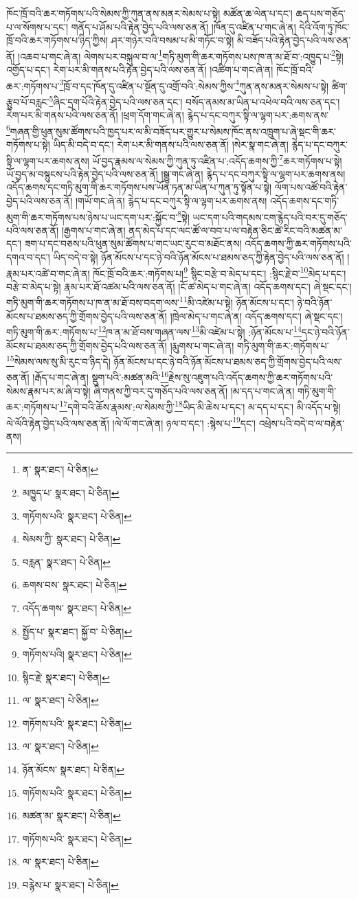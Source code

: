 ཁོང་ཁྲོ་བའི་ཆར་གཏོགས་པའི་སེམས་ཀྱི་ཀུན་ནས་མནར་སེམས་པ་སྟེ། མཚོན་ཆ་ལེན་པ་དང་། ཆད་པས་གཅོད་པ་ལ་སོགས་པ་དང་། གནོད་པ་ཤོམ་པའི་རྟེན་བྱེད་པའི་ལས་ཅན་ནོ། །ཁོན་དུ་འཛིན་པ་གང་ཞེ་ན། དེའི་འོག་ཏུ་ཁོང་ཁྲོ་བའི་ཆར་གཏོགས་པ་ཉིད་ཀྱིས། ཤར་གཉེར་བའི་བསམ་པ་མི་གཏོང་བ་སྟེ། མི་བཟོད་པའི་རྟེན་བྱེད་པའི་ལས་ཅན་ནོ། །འཆབ་པ་གང་ཞེ་ན། ལེགས་པར་བསྐུལ་བ་ལ་\footnote{ན་  སྣར་ཐང་།  པེ་ཅིན། }གཏི་མུག་གི་ཆར་གཏོགས་པས་ཁ་ན་མ་ཐོ་བ་:འཁྱུད་པ་\footnote{མཁྱུད་པ་  སྣར་ཐང་།  པེ་ཅིན། }སྟེ། འགྱོད་པ་དང་། རེག་པར་མི་གནས་པའི་རྟེན་བྱེད་པའི་ལས་ཅན་ནོ། །འཚིག་པ་གང་ཞེ་ན། ཁོང་ཁྲོ་བའི་ཆར་:གཏོགས་པ་\footnote{གཏོགས་པའི་  སྣར་ཐང་།  པེ་ཅིན། }ཁྲོ་བ་དང་ཁོན་དུ་འཛིན་པ་སྔོན་དུ་འགྲོ་བའི་:སེམས་ཀྱིས་\footnote{སེམས་ཀྱི་  སྣར་ཐང་།  པེ་ཅིན། }ཀུན་ནས་མནར་སེམས་པ་སྟེ། ཚིག་རྩུབ་པོ་བརླང་\footnote{བརླན་  སྣར་ཐང་།  པེ་ཅིན། }ཞིང་དྲག་པོའི་རྟེན་བྱེད་པའི་ལས་ཅན་དང་། བསོད་ནམས་མ་ཡིན་པ་འཕེལ་བའི་ལས་ཅན་དང་། རེག་པར་མི་གནས་པའི་ལས་ཅན་ནོ། །ཕྲག་དོག་གང་ཞེ་ན། རྙེད་པ་དང་བཀུར་སྟི་ལ་ལྷག་པར་:ཆགས་ནས་\footnote{ཆགས་བས་  སྣར་ཐང་།  པེ་ཅིན། }གཞན་གྱི་ཕུན་སུམ་ཚོགས་པའི་ཁྱད་པར་ལ་མི་བཟོད་པར་གྱུར་པ་སེམས་ཁོང་ནས་འཁྲུག་པ་ཞེ་སྡང་གི་ཆར་གཏོགས་པ་སྟེ། ཡིད་མི་བདེ་བ་དང་། རེག་པར་མི་གནས་པའི་ལས་ཅན་ནོ། །སེར་སྣ་གང་ཞེ་ན། རྙེད་པ་དང་བཀུར་སྟི་ལ་ལྷག་པར་ཆགས་ནས། ཡོ་བྱད་རྣམས་ལ་སེམས་ཀྱི་ཀུན་ཏུ་འཛིན་པ་:འདོད་ཆགས་ཀྱི་\footnote{འདོད་ཆགས་  སྣར་ཐང་།  པེ་ཅིན། }ཆར་གཏོགས་པ་སྟེ། ཡོ་བྱད་མ་བསྙུངས་པའི་རྟེན་བྱེད་པའི་ལས་ཅན་ནོ། །སྒྱུ་གང་ཞེ་ན། རྙེད་པ་དང་བཀུར་སྟི་ལ་ལྷག་པར་ཆགས་ནས། འདོད་ཆགས་དང་གཏི་མུག་གི་ཆར་གཏོགས་པས་ཡོན་ཏན་མ་ཡིན་པ་ཀུན་ཏུ་སྟོན་པ་སྟེ། ལོག་པས་འཚོ་བའི་རྟེན་བྱེད་པའི་ལས་ཅན་ནོ། །གཡོ་གང་ཞེ་ན། རྙེད་པ་དང་བཀུར་སྟི་ལ་ལྷག་པར་ཆགས་ནས། འདོད་ཆགས་དང་གཏི་མུག་གི་ཆར་གཏོགས་པས་ཉེས་པ་ཡང་དག་པར་:སྐྱོང་བ་\footnote{སྤྱོད་པ་  སྣར་ཐང་། སྐྱོ་བ་  པེ་ཅིན། }སྟེ། ཡང་དག་པའི་གདམས་ངག་རྙེད་པའི་བར་དུ་གཅོད་པའི་ལས་ཅན་ནོ། །རྒྱགས་པ་གང་ཞེ་ན། ནད་མེད་པ་དང་ལང་ཚོ་ལ་བབ་པ་ལ་བརྟེན་ཅིང་ཚེ་རིང་བའི་མཚན་མ་དང་། ཟག་པ་དང་བཅས་པའི་ཕུན་སུམ་ཚོགས་པ་གང་ཡང་རུང་བ་མཐོང་ནས། འདོད་ཆགས་ཀྱི་ཆར་གཏོགས་པའི་དགའ་བ་དང་། ཡིད་བདེ་བ་སྟེ། ཉོན་མོངས་པ་དང་ཉེ་བའི་ཉོན་མོངས་པ་ཐམས་ཅད་ཀྱི་རྟེན་བྱེད་པའི་ལས་ཅན་ནོ། །རྣམ་པར་འཚེ་བ་གང་ཞེ་ན། ཁོང་ཁྲོ་བའི་ཆར་:གཏོགས་པ།\footnote{གཏོགས་པའི།  སྣར་ཐང་།  པེ་ཅིན། } སྙིང་བརྩེ་བ་མེད་པ་དང་། :སྙིང་རྗེ་བ་\footnote{སྙིང་རྗེ་  སྣར་ཐང་།  པེ་ཅིན། }མེད་པ་དང་། བརྩེ་བ་མེད་པ་སྟེ། རྣམ་པར་ཐོ་འཚམ་པའི་ལས་ཅན་ནོ། །ངོ་ཚ་མེད་པ་གང་ཞེ་ན། འདོད་ཆགས་དང་། ཞེ་སྡང་དང་། གཏི་མུག་གི་ཆར་གཏོགས་པ་ཁ་ན་མ་ཐོ་བས་བདག་ལས་\footnote{ལ་  སྣར་ཐང་།  པེ་ཅིན། }མི་འཛེམ་པ་སྟེ། ཉོན་མོངས་པ་དང་། ཉེ་བའི་ཉོན་མོངས་པ་ཐམས་ཅད་ཀྱི་གྲོགས་བྱེད་པའི་ལས་ཅན་ནོ། །ཁྲེལ་མེད་པ་གང་ཞེ་ན། འདོད་ཆགས་དང་། ཞེ་སྡང་དང་། གཏི་མུག་གི་ཆར་:གཏོགས་པ་\footnote{གཏོགས་པའི་  སྣར་ཐང་།  པེ་ཅིན། }ཁ་ན་མ་ཐོ་བས་གཞན་ལས་\footnote{ལ་  སྣར་ཐང་།  པེ་ཅིན། }མི་འཛེམ་པ་སྟེ། :ཉོན་མོངས་པ་\footnote{ཉོན་མོངས་  སྣར་ཐང་།  པེ་ཅིན། }དང་ཉེ་བའི་ཉོན་མོངས་པ་ཐམས་ཅད་ཀྱི་གྲོགས་བྱེད་པའི་ལས་ཅན་ནོ། །རྨུགས་པ་གང་ཞེ་ན། གཏི་མུག་གི་ཆར་:གཏོགས་པ་\footnote{གཏོགས་པའི་  སྣར་ཐང་།  པེ་ཅིན། }སེམས་ལས་སུ་མི་རུང་བ་ཉིད་དེ། ཉོན་མོངས་པ་དང་ཉེ་བའི་ཉོན་མོངས་པ་ཐམས་ཅད་ཀྱི་གྲོགས་བྱེད་པའི་ལས་ཅན་ནོ། །རྒོད་པ་གང་ཞེ་ན། སྡུག་པའི་:མཚན་མའི་\footnote{མཚན་མ་  སྣར་ཐང་།  པེ་ཅིན། }རྗེས་སུ་འཇུག་པའི་འདོད་ཆགས་ཀྱི་ཆར་གཏོགས་པའི་སེམས་རྣམ་པར་མ་ཞི་བ་སྟེ། ཞི་གནས་ཀྱི་བར་དུ་གཅོད་པའི་ལས་ཅན་ནོ། །མ་དད་པ་གང་ཞེ་ན། གཏི་མུག་གི་ཆར་:གཏོགས་པ་\footnote{གཏོགས་པའི་  སྣར་ཐང་།  པེ་ཅིན། }དགེ་བའི་ཆོས་རྣམས་:ལ་སེམས་ཀྱི་\footnote{ལ་  སྣར་ཐང་།  པེ་ཅིན། }ཡིད་མི་ཆེས་པ་དང་། མ་དད་པ་དང་། མི་འདོད་པ་སྟེ། ལེ་ལོའི་རྟེན་བྱེད་པའི་ལས་ཅན་ནོ། །ལེ་ལོ་གང་ཞེ་ན། ཉལ་བ་དང་། :སྙེས་པ་\footnote{བརྙེས་པ་  སྣར་ཐང་།  པེ་ཅིན། }དང་། འཕྲེས་པའི་བདེ་བ་ལ་བརྟེན་ནས། 